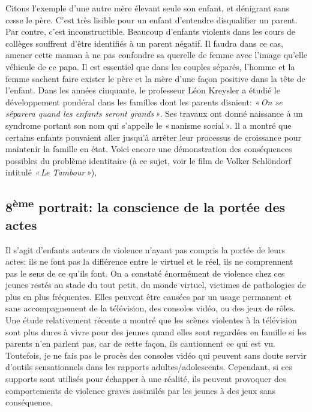 \documentclass[11pt]{article} %
\begin{document}
  Citons l'exemple d'une autre mère élevant seule son enfant, et dénigrant sans cesse le père. C'est très lisible pour un enfant d'entendre disqualifier un parent. Par contre, c'est inconstructible. Beaucoup d'enfants violents dans les cours de collèges souffrent d'être identifiés à un parent négatif. Il faudra dans ce cas, amener cette maman à ne pas confondre sa querelle de femme avec l'image qu'elle véhicule de ce papa. Il est essentiel que dans les couples séparés, l'homme et la femme sachent faire exister le père et la mère d'une façon positive dans la tête de l'enfant.\newline
  Dans les années cinquante, le professeur Léon Kreysler a étudié le développement pondéral dans les familles dont les parents disaient: \textit{« On se séparera quand les enfants seront grands »}. Ses travaux ont donné naissance à un syndrome portant son nom qui s'appelle le « nanisme social ». Il a montré que certains enfants pouvaient aller jusqu'à arrêter leur processus de croissance pour maintenir la famille en état. Voici encore une démonstration des conséquences possibles du problème identitaire (à ce sujet, voir le film de Volker Schlöndorf intitulé \textit{« Le Tambour »}),

\subsection{8\textsuperscript{ème} portrait: la conscience de la portée des actes }

  Il s'agit d'enfants auteurs de violence n'ayant pas compris la portée de leurs actes: ils ne font pas la différence entre le virtuel et le réel, ils ne comprennent pas le sens de ce qu'ils font. On a constaté énormément de violence chez ces jeunes restés au stade du tout petit, du monde virtuel, victimes de pathologies de plus en plus fréquentes.\newline
  Elles peuvent être causées par un usage permanent et sans accompagnement de la télévision, des consoles vidéo, ou des jeux de rôles. Une étude relativement récente a montré que les scènes violentes à la télévision sont plus dures à vivre pour des jeunes quand elles sont regardées en famille si les parents n'en parlent pas, car de cette façon, ils cautionnent ce qui est vu. Toutefois, je ne fais pas le procès des consoles vidéo qui peuvent sans doute servir d'outils sensationnels dans les rapports adultes/adolescents.\newline
  Cependant, si ces supports sont utilisés pour échapper à une réalité, ils peuvent provoquer des comportements de violence graves assimilés par les jeunes à des jeux sans conséquence.
\end{document}
